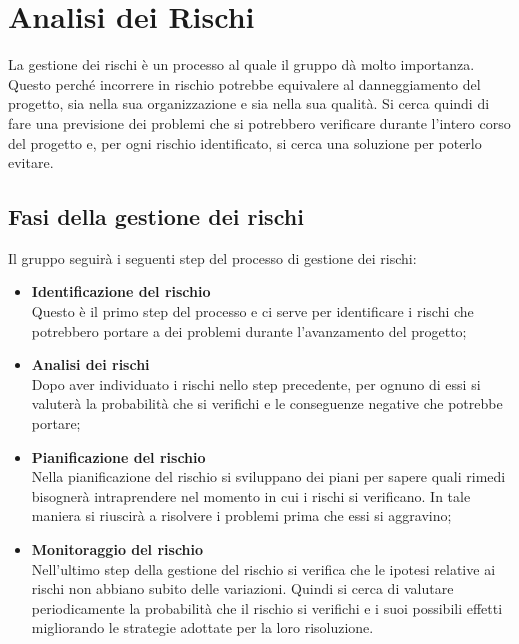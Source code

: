 \section{Analisi dei Rischi}
La gestione dei rischi è un processo al quale il gruppo \Gruppo{} dà molto importanza. Questo perché incorrere in rischio potrebbe equivalere al danneggiamento del progetto, sia nella sua organizzazione e sia nella sua qualità.
Si cerca quindi di fare una previsione dei problemi che si potrebbero verificare durante l'intero corso del progetto e, per ogni rischio identificato, si cerca una soluzione per poterlo evitare.

\subsection{Fasi della gestione dei rischi}
Il gruppo seguirà i seguenti step del processo di gestione dei rischi:
\begin{itemize}
	\item \textbf{Identificazione del rischio}
	\\ Questo è il primo step del processo e ci serve per identificare i rischi che potrebbero portare a dei problemi durante l'avanzamento del progetto; 
\end{itemize}
\begin{itemize}
	\item \textbf{Analisi dei rischi}
	\\ Dopo aver individuato i rischi nello step precedente, per ognuno di essi si valuterà la probabilità che si verifichi e le conseguenze negative che potrebbe portare;
\end{itemize}
\begin{itemize}
	\item \textbf{Pianificazione del rischio}
	\\ Nella pianificazione del rischio si sviluppano dei piani per sapere quali rimedi bisognerà intraprendere nel momento in cui i rischi si verificano. In tale maniera si riuscirà a risolvere i problemi prima che essi si aggravino;
\end{itemize}
\begin{itemize}
	\item \textbf{Monitoraggio del rischio} 
	\\ Nell'ultimo step della gestione del rischio si verifica che le ipotesi relative ai rischi non abbiano subito delle variazioni. Quindi si cerca di valutare periodicamente la probabilità che il rischio si verifichi e i suoi possibili effetti migliorando le strategie adottate per la loro risoluzione.
\end{itemize}

